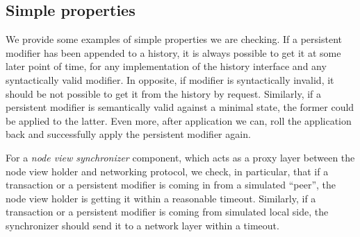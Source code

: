 \subsection{Simple properties}
\label{sec:simple-props}

We provide some examples of simple properties we are checking. If a persistent modifier has been appended to a history, it is always possible to get it at some later point of time, for any implementation of the history interface and any syntactically valid modifier. In opposite, if modifier is syntactically invalid, it should be not possible to get it from the history by request. Similarly, if a persistent modifier is semantically valid against a minimal state, the former could be applied to the latter. Even more, after application we can, roll the application back and successfully apply the persistent modifier again.  

For a {\em node view synchronizer} component, which acts as a proxy layer between the node view holder and networking protocol, we check, in particular, that if a transaction or a persistent modifier is coming in from a simulated ``peer'', the node view holder is getting it within a reasonable timeout. Similarly, if a transaction or a persistent modifier is coming from simulated local side, the synchronizer should send it to a network layer within a timeout.
